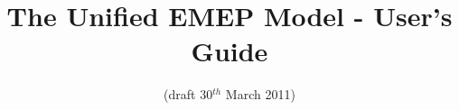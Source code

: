 \documentclass[a4paper,12pt]{report}
\begin{document}

\title{The Unified EMEP Model - User's Guide}
\date{(draft 30$^{th}$ March 2011)}
\maketitle

\tableofcontents
\setcounter{page}{0}







%
%
%
%
%
%
%
%
%
%
%
%

\end{document}
